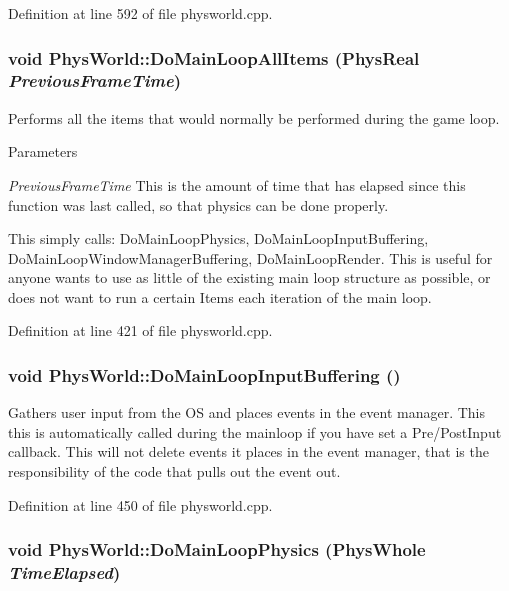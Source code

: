 Definition at line 592 of file physworld.cpp.\hypertarget{classPhysWorld_a174da29a119080c44ba628cb25918f8c}{
\subsubsection[{DoMainLoopAllItems}]{\setlength{\rightskip}{0pt plus 5cm}void PhysWorld::DoMainLoopAllItems (PhysReal {\em PreviousFrameTime})}}
\label{db/df5/classPhysWorld_a174da29a119080c44ba628cb25918f8c}


Performs all the items that would normally be performed during the game loop. 
\begin{DoxyParams}{Parameters}
\item[{\em PreviousFrameTime}]This is the amount of time that has elapsed since this function was last called, so that physics can be done properly.\end{DoxyParams}
This simply calls: DoMainLoopPhysics, DoMainLoopInputBuffering, DoMainLoopWindowManagerBuffering, DoMainLoopRender. This is useful for anyone wants to use as little of the existing main loop structure as possible, or does not want to run a certain Items each iteration of the main loop. 

Definition at line 421 of file physworld.cpp.\hypertarget{classPhysWorld_a81b3f0dcc0a90d039623f696343e6e9c}{
\subsubsection[{DoMainLoopInputBuffering}]{\setlength{\rightskip}{0pt plus 5cm}void PhysWorld::DoMainLoopInputBuffering ()}}
\label{db/df5/classPhysWorld_a81b3f0dcc0a90d039623f696343e6e9c}


Gathers user input from the OS and places events in the event manager. This this is automatically called during the mainloop if you have set a Pre/PostInput callback. This will not delete events it places in the event manager, that is the responsibility of the code that pulls out the event out. 

Definition at line 450 of file physworld.cpp.\hypertarget{classPhysWorld_a4d8e06d2f8459a286eb01e68df2d1828}{
\subsubsection[{DoMainLoopPhysics}]{\setlength{\rightskip}{0pt plus 5cm}void PhysWorld::DoMainLoopPhysics (PhysWhole {\em TimeElapsed})}}
\label{db/df5/classPhysWorld_a4d8e06d2f8459a286eb01e68df2d1828}


